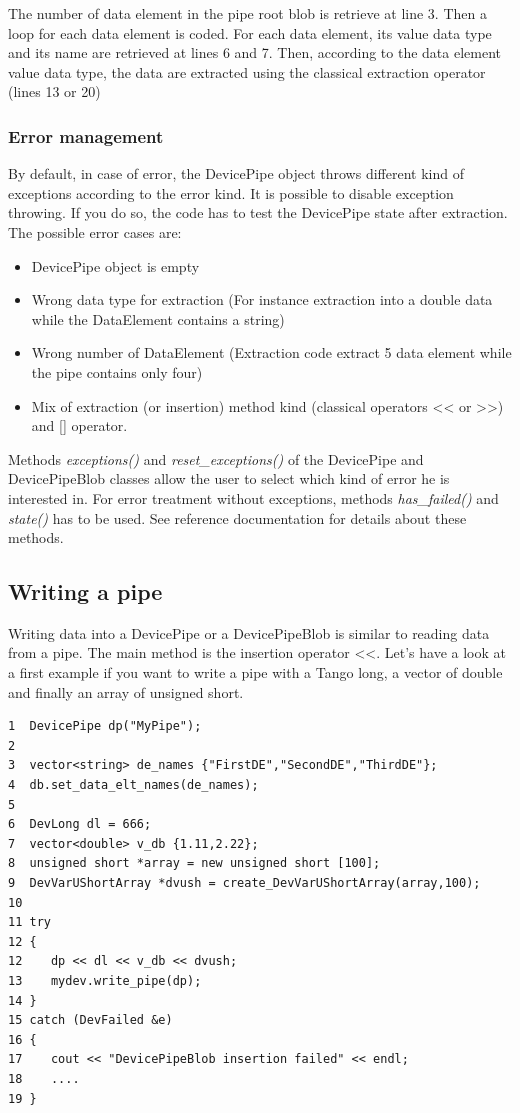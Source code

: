 The number of data element in the pipe root blob is retrieve at line
3. Then a loop for each data element is coded. For each data element,
its value data type and its name are retrieved at lines 6 and 7. Then,
according to the data element value data type, the data are extracted
using the classical extraction operator (lines 13 or 20)


\subsubsection{Error management}

By default, in case of error, the DevicePipe object throws different
kind of exceptions according to the error kind. It is possible to
disable exception throwing. If you do so, the code has to test the
DevicePipe state after extraction. The possible error cases are:
\begin{itemize}
\item DevicePipe object is empty
\item Wrong data type for extraction (For instance extraction into a double
data while the DataElement contains a string)
\item Wrong number of DataElement (Extraction code extract 5 data element
while the pipe contains only four)
\item Mix of extraction (or insertion) method kind (classical operators
<\textcompwordmark{}< or >\textcompwordmark{}>) and {[}{]} operator.
\end{itemize}
Methods \emph{exceptions()} and \emph{reset\_exceptions()} of the
DevicePipe and DevicePipeBlob classes allow the user to select which
kind of error he is interested in. For error treatment without exceptions,
methods \emph{has\_failed()} and \emph{state()} has to be used. See
reference documentation for details about these methods.


\subsection{Writing a pipe}

Writing data into a DevicePipe or a DevicePipeBlob is similar to reading
data from a pipe. The main method is the insertion operator \textquotedbl{}<\textcompwordmark{}<\textquotedbl{}.
Let's have a look at a first example if you want to write a pipe with
a Tango long, a vector of double and finally an array of unsigned
short.


\begin{verbatim}
1  DevicePipe dp("MyPipe");
2 
3  vector<string> de_names {"FirstDE","SecondDE","ThirdDE"};
4  db.set_data_elt_names(de_names);
5
6  DevLong dl = 666;  
7  vector<double> v_db {1.11,2.22};
8  unsigned short *array = new unsigned short [100];
9  DevVarUShortArray *dvush = create_DevVarUShortArray(array,100);
10
11 try  
12 {     
12    dp << dl << v_db << dvush;
13    mydev.write_pipe(dp);
14 }
15 catch (DevFailed &e)
16 {     
17    cout << "DevicePipeBlob insertion failed" << endl;     
18    ....  
19 }
\end{verbatim}


